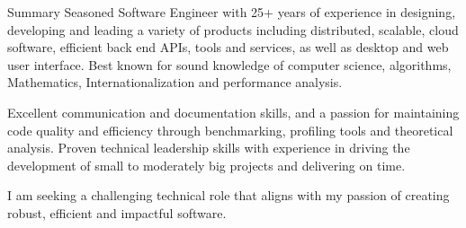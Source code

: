\documentclass{resume}
\author{\textsc{Umesh Nair}}
\begin{document}
\maketitle
\addtolength{\parskip}{\baselineskip}

\iftrue
\begin{category}{Summary}
\citembullet Seasoned Software Engineer with 25+ years of experience in designing, developing and leading a variety of products including
distributed, scalable, cloud software, efficient back end APIs, tools and services, as well as desktop and web user interface.  Best known for sound knowledge of computer
science, algorithms, Mathematics, Internationalization and performance analysis.

Excellent communication and documentation skills, and a passion for
maintaining code quality and efficiency through benchmarking, profiling tools and theoretical analysis.  Proven technical leadership skills with experience in driving the
development of small to moderately big projects and delivering on time.

I am seeking a challenging technical role that aligns with my passion of creating robust, efficient and impactful software.



\end{category}
\fi

\end{document}
